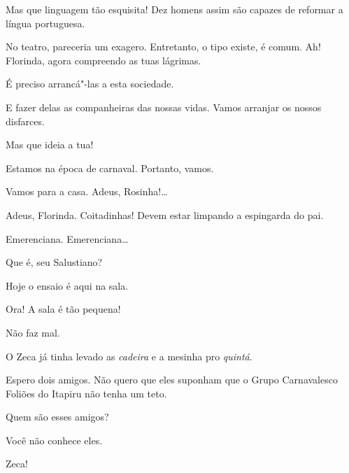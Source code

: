 \begin{linenumbers}
Mas que linguagem tão esquisita! Dez homens
assim são capazes de reformar a língua portuguesa.

 No teatro,
pareceria um exagero. Entretanto, o tipo existe, é comum.
Ah! Florinda, agora compreendo as tuas lágrimas.

  É
preciso arrancá"-las a esta sociedade.

 E fazer delas as
companheiras das nossas vidas. Vamos arranjar os nossos disfarces.

Mas que ideia a tua!

 Estamos na
época de carnaval. Portanto, vamos.

 Vamos para
a casa. Adeus, Rosinha!\ldots{}

 Adeus, Florinda. Coitadinhas! Devem
estar limpando a espingarda do pai. 








 Emerenciana.
Emerenciana\ldots{}

  
Que é, seu Salustiano?

  
Hoje o ensaio é aqui na sala.

 Ora! A sala é tão pequena!

 Não faz mal.

 O Zeca
já tinha levado as \textit{cadeira}
e a mesinha pro \textit{quintá}.

 Espero dois amigos. Não
quero que eles suponham que o Grupo Carnavalesco
Foliões do Itapiru não
tenha um teto.

 Quem
são esses amigos?

 Você não conhece eles.

  Zeca!


\end{linenumbers}
